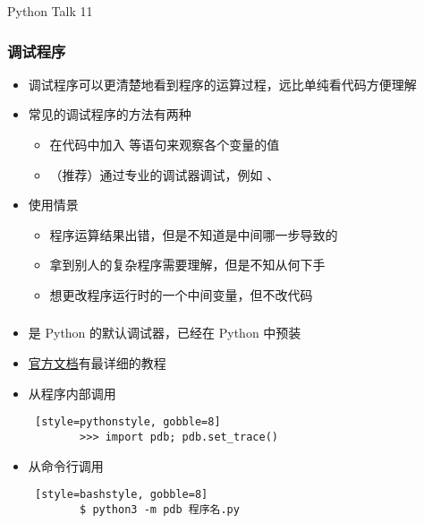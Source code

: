 



\PreFirstFrame
\begin{frame} [fragile]
	\centerline{\fontsize{42}{42}\selectfont Python Talk 11}
\end{frame}
\PostFirstFrame

\begin{frame}
	\frametitle{调试程序}
	\linespread{1.5}
	\begin{itemize}
	\item 调试程序可以更清楚地看到程序的运算过程，远比单纯看代码方便理解
	\item 常见的调试程序的方法有两种
		\begin{itemize}
		\item 在代码中加入  等语句来观察各个变量的值
		\item （推荐）通过专业的调试器调试，例如
				、
		\end{itemize}
	\item 使用情景
		\begin{itemize}
		\item 程序运算结果出错，但是不知道是中间哪一步导致的
		\item 拿到别人的复杂程序需要理解，但是不知从何下手
		\item 想更改程序运行时的一个中间变量，但不改代码
		\end{itemize}
	\end{itemize}
\end{frame}

\begin{frame} [fragile]
	\frametitle{}
	\linespread{1.5}
	\begin{itemize}
	\item {} 是 Python 的默认调试器，已经在 Python 中预装
	\item \href{https://docs.python.org/3/library/pdb.html}{官方文档}有最详细的教程
	\item 从程序内部调用
		\begin{lstlisting} [style=pythonstyle, gobble=8]
		>>> import pdb; pdb.set_trace()
		\end{lstlisting}
	\item 从命令行调用
		\begin{lstlisting} [style=bashstyle, gobble=8]
		$ python3 -m pdb 程序名.py
		\end{lstlisting}
	\end{itemize}
\end{frame}


